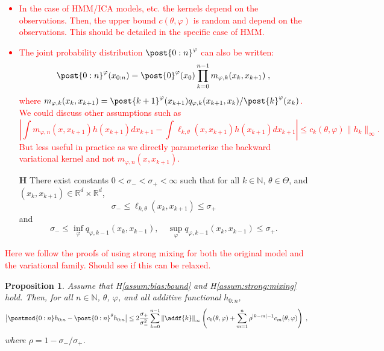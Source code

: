 \documentclass{article}
\newtheorem{proposition}[theorem]{Proposition}
\newcommand{\uksymbol}{\ell}
\newcommand{\udlow}{\sigma_-}
\newcommand{\udup}{\sigma_+}
\newcommand{\ud}[1]{\uksymbol_{#1}}
\newcommand{\nset}{\mathbb{N}}
\newcommand{\1}{\mathbbm{1}}
\newcommand{\parvec}{\theta}
\newcommand{\eqdef}{\ensuremath{:=}}
\newcommand{\eqsp}{\;}
\newcounter{hypH}
\newenvironment{hypH}{\refstepcounter{hypH}\begin{itemize}
\item[{\bf H\arabic{hypH}}]}{\end{itemize}}
\newcommand{\qg}[1]{\ell_{#1}}
\begin{document}
\textcolor{red}{
\begin{itemize}
\item In the case of HMM/ICA models, etc. the kernels depend on the observations. Then, the upper bound $c(\parvec,\varphi)$ is random and depend on the observations. This should be detailed in the specific case of HMM.
\item The joint probability distribution $\post{0:n}^{\varphi}$ can also be written:
$$
 \post{0:n}^{\varphi}(x_{0:n})=  \post{0}^{\varphi}(x_0)\prod_{k=0}^{n-1}m_{\varphi,k}(x_{k},x_{k+1})\eqsp,
$$
where $m_{\varphi,k}(x_{k},x_{k+1}) =   \post{k+1}^{\varphi}(x_{k+1})q_{\varphi,k}(x_{k+1},x_k)/ \post{k}^{\varphi}(x_k)$. We could discuss other assumptions such as 
$$
\left|\int m_{\varphi,n}(x,x_{k+1}) h (x_{k+1})dx_{k+1}- \int\qg{k,\parvec}(x,x_{k+1}) h (x_{k+1})dx_{k+1}\right| \leqslant c_k(\parvec,\varphi) \| h_k \|_\infty. 
$$
But less useful in practice as we directly parameterize the backward variational kernel and not $ m_{\varphi,n}(x,x_{k+1}) $.
\end{itemize}}

\begin{hypH}
\label{assum:strong:mixing}
There exist constants $0 < \udlow < \udup < \infty$ such that for all $k \in \nset$, $\theta\in\Theta$, and $(x_k, x_{k + 1}) \in \mathbb{R}^d \times \mathbb{R}^d$, 
$$
    \udlow \leq \ud{k,\theta}(x_k, x_{k + 1}) \leq \udup
$$ 
and 
$$
    \udlow \leq \inf_{\varphi} q_{\varphi,k-1}(x_k, x_{k -1}), \quad \sup_{\varphi} q_{\varphi,k-1}(x_k, x_{k -1}) \leq \udup. 
$$ 
\end{hypH}
\textcolor{red}{Here we follow the proofs of \cite{gloaguen2019pseudo} using strong mixing for both the original model and the variational family. Should see if this can be relaxed.}

\begin{proposition}
\label{prop:bias}
Assume that H\ref{assum:bias:bound} and H\ref{assum:strong:mixing} hold. Then, for all $n \in \nset$, $\parvec$, $\varphi$, and all additive functional $h_{0:n}$,  
$$
        \big| \postmod{0:n} h_{0:n} -  \post{0:n}^{\parvec} h_{0:n} \big| 
        \leq 2\frac{\sigma_+}{\sigma_-^2}\sum_{k=0}^{n-1}\left\| \addf{k}\right\|_\infty\left( c_0(\theta,\varphi) + \sum_{m=1}^n \rho^{|k-m|-1}c_m(\theta,\varphi)\right)\eqsp,%
$$
where $\rho = 1-\sigma_-/\sigma_+$.
\end{proposition}
\end{document}
